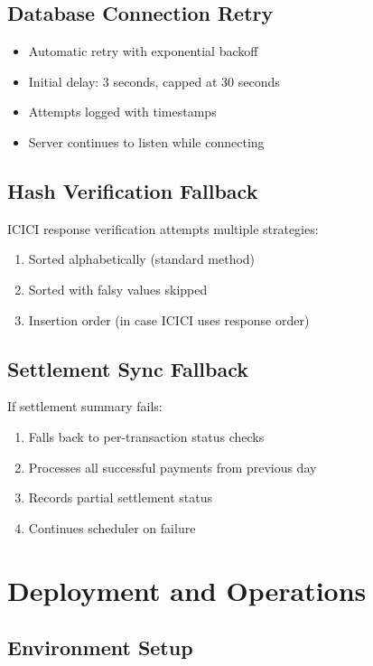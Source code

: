 \documentclass[12pt,a4paper]{article}
\begin{document}
\subsection{Database Connection Retry}
\begin{itemize}
  \item Automatic retry with exponential backoff
  \item Initial delay: 3 seconds, capped at 30 seconds
  \item Attempts logged with timestamps
  \item Server continues to listen while connecting
\end{itemize}

\subsection{Hash Verification Fallback}
ICICI response verification attempts multiple strategies:
\begin{enumerate}
  \item Sorted alphabetically (standard method)
  \item Sorted with falsy values skipped
  \item Insertion order (in case ICICI uses response order)
\end{enumerate}

\subsection{Settlement Sync Fallback}
If settlement summary fails:
\begin{enumerate}
  \item Falls back to per-transaction status checks
  \item Processes all successful payments from previous day
  \item Records partial settlement status
  \item Continues scheduler on failure
\end{enumerate}

\section{Deployment and Operations}

\subsection{Environment Setup}
\end{document}
